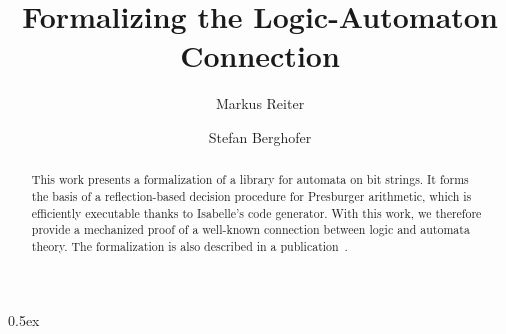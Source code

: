 \documentclass[11pt,a4paper]{article}
\begin{document}
\title{Formalizing the Logic-Automaton Connection}
\author{Markus Reiter \and Stefan Berghofer}
\maketitle

\begin{abstract}
This work presents a formalization of a library for automata on bit strings.
It forms the basis of a reflection-based
decision procedure for Presburger arithmetic, which is efficiently executable
thanks to Isabelle's code generator. With this work, we therefore provide a
mechanized proof of a well-known connection between logic and automata theory.
The formalization is also described in a publication~\cite{BerghoferR-TPHOLs09}.
\end{abstract}

\tableofcontents

\parindent 0pt\parskip 0.5ex



\nocite{Boudet-Comon-CAAP96,Klarlund-CSL97}



\end{document}

